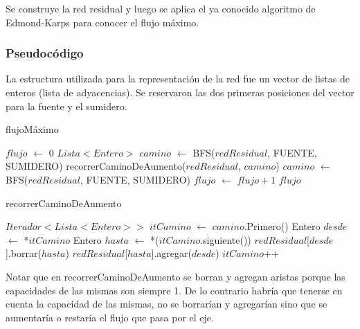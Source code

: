 Se construye la red residual y luego se aplica el ya conocido algoritmo de Edmond-Karps para conocer el flujo máximo.

\subsubsection*{Pseudocódigo}

La estructura utilizada para la representación de la red fue un vector de listas de enteros (lista de adyacencias). Se reservaron las dos primeras posiciones del vector para la fuente y el sumidero.

\begin{algorithm}[]
	\caption{flujoMáximo}

	$flujo$ $\gets$ 0 \;
	$Lista<Entero>$ $camino$ $\gets$ BFS($redResidual$, FUENTE, SUMIDERO) \;
	 {
		recorrerCaminoDeAumento($redResidual$, $camino$) \;
		$camino$ $\gets$ BFS($redResidual$, FUENTE, SUMIDERO) \;
		$flujo$ $\gets$ $flujo + 1$ \;
	}
	\Return $flujo$ \;
\end{algorithm}

\begin{algorithm}[]
	\caption{recorrerCaminoDeAumento}

	$Iterador<Lista<Entero>>$ $itCamino$ $\gets$ $camino$.Primero() \;
	 {
		Entero $desde$ $\gets$ *$itCamino$ \;
		Entero $hasta$ $\gets$ *($itCamino$.siguiente()) \;
		$redResidual$[$desde$].borrar($hasta$) \;
		$redResidual$[$hasta$].agregar($desde$) \;
		$itCamino$++ \;
	}
\end{algorithm}

Notar que en recorrerCaminoDeAumento se borran y agregan aristas porque las capacidades de las mismas son siempre 1. De lo contrario habría que tenerse en cuenta la capacidad de las mismas, no se borrarían y agregarían sino que se aumentaría o restaría el flujo que pasa por el eje.

